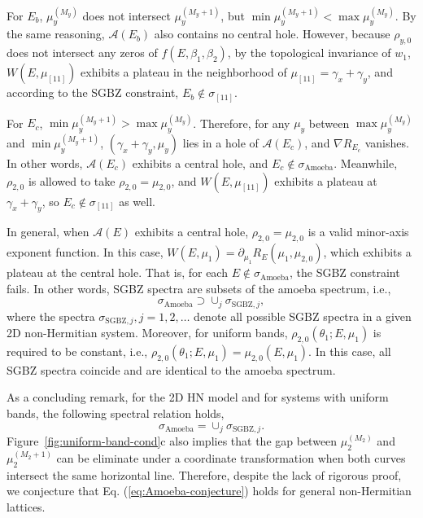 For $E_{b}$, $\mu_{y}^{(M_{y})}$ does not intersect $\mu_{y}^{(M_{y}+1)}$,
but $\min\mu_{y}^{(M_{y}+1)}<\max\mu_{y}^{(M_{y})}$. By the same
reasoning, $\mathcal{A}(E_{b})$ also contains no central hole. However,
because $\rho_{y,0}$ does not intersect any zeros of $f(E,\beta_{1},\beta_{2})$,
by the topological invariance of $w_{1}$, $W(E,\mu_{[11]})$ exhibits
a plateau in the neighborhood of $\mu_{[11]}=\gamma_{x}+\gamma_{y}$,
and according to the SGBZ constraint, $E_{b}\notin\sigma_{[11]}$.

For $E_{c}$, $\min\mu_{y}^{(M_{y}+1)}>\max\mu_{y}^{(M_{y})}$. Therefore,
for any $\mu_{y}$ between $\max\mu_{y}^{(M_{y})}$ and $\min\mu_{y}^{(M_{y}+1)}$,
$(\gamma_{x}+\gamma_{y},\mu_{y})$ lies in a hole of $\mathcal{A}(E_{c})$,
and $\nabla R_{E_{c}}$ vanishes. In other words, $\mathcal{A}(E_{c})$
exhibits a central hole, and $E_{c}\notin\sigma_{\text{Amoeba}}$.
Meanwhile, $\rho_{2,0}$ is allowed to take $\rho_{2,0}=\mu_{2,0}$,
and $W(E,\mu_{[11]})$ exhibits a plateau at $\gamma_{x}+\gamma_{y}$,
so $E_{c}\notin\sigma_{[11]}$ as well.

In general, when $\mathcal{A}(E)$ exhibits a central hole, $\rho_{2,0}=\mu_{2,0}$
is a valid minor-axis exponent function. In this case, $W(E,\mu_{1})=\partial_{\mu_{1}}R_{E}(\mu_{1},\mu_{2,0})$,
which exhibits a plateau at the central hole. That is, for each $E\notin\sigma_{\text{Amoeba}}$,
the SGBZ constraint fails. In other words, SGBZ spectra are subsets
of the amoeba spectrum, i.e., 
\begin{equation}
\sigma_{\text{Amoeba}}\supset\cup_{j}\sigma_{\text{SGBZ},j},
\end{equation}
where the spectra $\sigma_{\text{SGBZ},j},j=1,2,\dots$ denote all
possible SGBZ spectra in a given 2D non-Hermitian system. Moreover,
for uniform bands, $\rho_{2,0}(\theta_{1};E,\mu_{1})$ is required
to be constant, i.e., $\rho_{2,0}(\theta_{1};E,\mu_{1})=\mu_{2,0}(E,\mu_{1})$.
In this case, all SGBZ spectra coincide and are identical to the amoeba
spectrum.

As a concluding remark, for the 2D HN model and for systems with uniform
bands, the following spectral relation holds, 
\begin{equation}
\sigma_{\text{Amoeba}}=\cup_{j}\sigma_{\text{SGBZ},j}.\label{eq:Amoeba-conjecture}
\end{equation}
Figure~\ref{fig:uniform-band-cond}c also implies that the gap between $\mu_{2}^{(M_{2})}$ and
$\mu_{2}^{(M_{2}+1)}$ can be eliminate under a coordinate transformation
when both curves intersect the same horizontal line. Therefore, despite
the lack of rigorous proof, we conjecture that Eq. (\ref{eq:Amoeba-conjecture})
holds for general non-Hermitian lattices.

